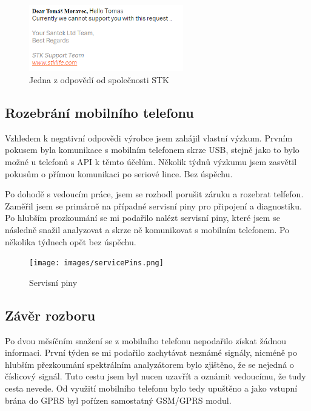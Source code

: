 \documentclass[FM,DP]{tulthesis}  %
\begin{document}
\begin{figure}[H]
\begin{center}
\includegraphics[width=0.6\textwidth]{images/response.png}
\caption{Jedna z odpovědí od společnosti STK}
\label{image}
\end{center}
\end{figure}

\subsection{Rozebrání mobilního telefonu}
Vzhledem k negativní odpovědi výrobce jsem zahájil vlastní výzkum. Prvním pokusem byla komunikace s mobilním telefonem skrze USB, stejně jako to bylo možné u telefonů s API k těmto účelům. Několik týdnů výzkumu jsem zasvětil pokusům o přímou komunikaci po seriové lince. Bez úspěchu.

Po dohodě s vedoucím práce, jsem se rozhodl porušit záruku a rozebrat telfefon. Zaměřil jsem se primárně na případné servisní piny pro připojení a diagnostiku. Po hlubším prozkoumání se mi podařilo nalézt servisní piny, které jsem se následně snažil analyzovat a skrze ně komunikovat s mobilním telefonem. Po několika týdnech opět bez úspěchu.

\begin{figure}[H]
\begin{center}
\texttt{[image: images/servicePins.png]}
\caption{Servisní piny}
\label{image}
\end{center}
\end{figure}

\subsection{Závěr rozboru}
Po dvou měsíčním snažení se z mobilního telefonu nepodařilo získat žádnou informaci. První týden se mi podařilo zachytávat neznámé signály, nicméně po hlubším přezkoumání spektrálním analyzátorem bylo zjištěno, že se nejedná o číslicový signál. Tuto cestu jsem byl nucen uzavřít a oznámit vedoucímu, že tudy cesta nevede. Od využití mobilního telefonu bylo tedy upuštěno a jako vstupní brána do GPRS byl pořízen samostatný GSM/GPRS modul.
\end{document}
